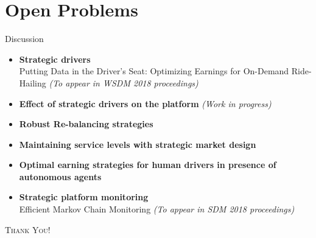 
\section{Open Problems}

	\begin{frame}{Discussion}
		\begin{itemize}
			\item \textbf{Strategic drivers} \\
			Putting Data in the Driver's Seat: Optimizing Earnings for On-Demand Ride-Hailing
			\textit{\small (To appear in WSDM 2018 proceedings)}
			\pause
			\item \textbf{Effect of strategic drivers on the platform}
			\textit{(Work in progress)}
			\pause
			\item \textbf{Robust Re-balancing strategies}
			\pause
			\item \textbf{Maintaining service levels with strategic market design}
			\pause
			\item \textbf{Optimal earning strategies for human drivers in presence of autonomous agents}
			\pause
			\item \textbf{Strategic platform monitoring} \\
			Efficient Markov Chain Monitoring
			\textit{\small (To appear in SDM 2018 proceedings)}
		\end{itemize}
	\end{frame}

    \begin{frame}
        \centering
        \Huge{\textsc{Thank You!}}
    \end{frame}